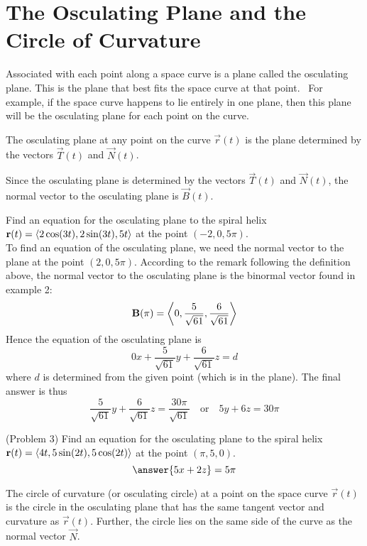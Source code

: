 \documentclass[handout]{ximera}
\begin{document}
\section{The Osculating Plane and the Circle of Curvature}

Associated with each point along a space curve is a plane called the osculating plane.  This is the plane that best fits the space curve at that point.  \
For example, if the space curve happens to lie entirely in one plane, then this plane will be the osculating plane for each point on the curve.

\begin{definition}
The osculating plane at any point on the curve $\vec r(t)$ is the plane determined by the vectors $\vec T(t)$ and $\vec N(t)$.
\end{definition}

\begin{remark}
Since the osculating plane is determined by the vectors $\vec T(t)$ and $\vec N(t)$, the normal vector to the osculating plane is $\vec B(t)$.
\end{remark}

\begin{example}[Example 3]
Find an equation for the osculating plane to the spiral helix $\mathbf r(t) =  \left\langle 2\cos(3t), 2\sin(3t), 5t\right\rangle$ at the point $(-2, 0, 5\pi)$.\\
To find an equation of the osculating plane, we need the normal vector to the plane at the point $(2, 0, 5\pi)$.
According to the remark following the definition above, the normal vector to the osculating plane is the binormal vector found in example 2:
\[
\mathbf B(\pi) =   \left\langle 0, \frac{5}{\sqrt {61}}, \frac{6}{\sqrt{61}}\right\rangle
\]
Hence the equation of the osculating plane is
\[
0x + \frac{5}{\sqrt {61}}y +\frac{6}{\sqrt{61}}z = d
\]
where $d$ is determined from the given point (which is in the plane).
The final answer is thus
\[
\frac{5}{\sqrt {61}}y +\frac{6}{\sqrt{61}}z = \frac{30\pi}{\sqrt{61}} \quad \text{or} \quad 5y+6z = 30\pi
\]
\end{example}

\begin{problem}(Problem 3)
Find an equation for the osculating plane to the spiral helix $\mathbf r(t) = \left\langle 4t, 5 \sin(2t),5\cos(2t)\right\rangle$ at the point $(\pi, 5, 0)$.\\
\[
\answer{5x + 2z } = 5\pi
\]
\end{problem}

\begin{definition}
The circle of curvature (or osculating circle) at a point on the space curve $\vec r(t)$ is the circle in 
the osculating plane that has the same tangent vector and curvature as $\vec r(t)$.  
Further, the circle lies on the same side of the curve as the normal vector $\vec N$.
\end{definition}
\end{document}
